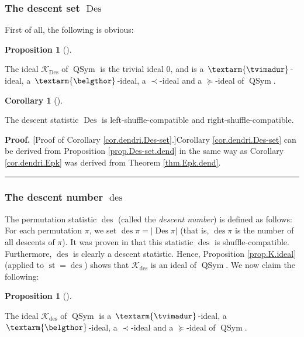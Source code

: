 \documentclass[numbers=enddot,12pt,final,onecolumn,notitlepage]{scrartcl}%
\theoremstyle{definition}
\newtheorem{prop}[theo]{Proposition}
\newenvironment{proposition}[1][]
{\begin{prop}[#1]\begin{leftbar}}
{\end{leftbar}\end{prop}}
\newtheorem{coro}[theo]{Corollary}
\newenvironment{corollary}[1][]
{\begin{coro}[#1]\begin{leftbar}}
{\end{leftbar}\end{coro}}
\newenvironment{proof}[1][Proof]{\noindent\textbf{#1.} }{\ \rule{0.5em}{0.5em}}
\newenvironment{verlong}{}{}
\newcommand{\tvi}{\left. \textarm{\tvimadur} \right.}
\newcommand{\bel}{\left. \textarm{\belgthor} \right.}
\begin{document}
\begin{verlong}
\subsubsection{The descent set $\operatorname{Des}$}

First of all, the following is obvious:

\begin{proposition}
\label{prop.Des-set.dend}The ideal $\mathcal{K}_{\operatorname{Des}}$ of
$\operatorname*{QSym}$ is the trivial ideal $0$, and is a $\tvi$-ideal, a
$\bel$-ideal, a $\left.  \prec\right.  $-ideal and a $\left.  \succeq\right.
$-ideal of $\operatorname*{QSym}$.
\end{proposition}

\begin{corollary}
\label{cor.dendri.Des-set}The descent statistic $\operatorname{Des}$ is
left-shuffle-compatible and right-shuffle-compatible.
\end{corollary}

\begin{proof}
[Proof of Corollary \ref{cor.dendri.Des-set}.]Corollary
\ref{cor.dendri.Des-set} can be derived from Proposition
\ref{prop.Des-set.dend} in the same way as Corollary \ref{cor.dendri.Epk} was
derived from Theorem \ref{thm.Epk.dend}.
\end{proof}

\subsubsection{The descent number $\operatorname{des}$}

The permutation statistic $\operatorname{des}$ (called the \textit{descent
number}) is defined as follows: For each permutation $\pi$, we set
$\operatorname{des}\pi=\left\vert \operatorname{Des}\pi\right\vert $ (that
is, $\operatorname{des}\pi$ is the number of all descents of $\pi$). It was
proven in \cite[Theorem 4.6 \textbf{(a)}]{part1} that this statistic
$\operatorname{des}$ is shuffle-compatible. Furthermore, $\operatorname{des}%
$ is clearly a descent statistic. Hence, Proposition \ref{prop.K.ideal}
(applied to $\operatorname{st}=\operatorname{des}$) shows that
$\mathcal{K}_{\operatorname{des}}$ is an ideal of $\operatorname*{QSym}$. We
now claim the following:

\begin{proposition}
\label{prop.des.dend}The ideal $\mathcal{K}_{\operatorname{des}}$ of
$\operatorname*{QSym}$ is a $\tvi$-ideal, a $\bel$-ideal, a $\left.
\prec\right.  $-ideal and a $\left.  \succeq\right.  $-ideal of
$\operatorname*{QSym}$.
\end{proposition}


\end{verlong}
\end{document}
